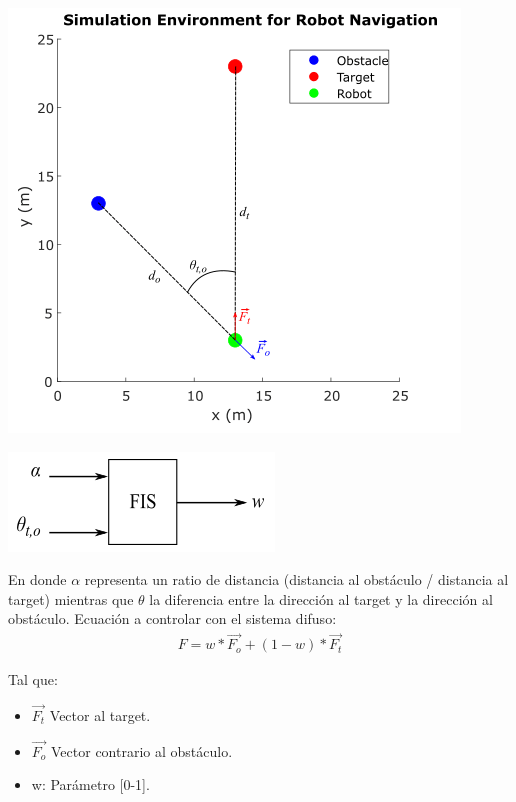 \begin{center}
    \includegraphics[scale=0.6]{Tesis/Capitulos/04_CAPITULO_2/img/MySimAvoidObs1_env.png}
\end{center}

\begin{center}
    \includegraphics[scale=0.6]{Tesis/Capitulos/04_CAPITULO_2/img/MySimAvoidObs1_system.png}
\end{center}

En donde $\alpha$ representa un ratio de distancia (distancia al obstáculo / distancia al target) mientras que $\theta$ la diferencia entre la dirección al target y la dirección al obstáculo.
\bigbreak
Ecuación a controlar con el sistema difuso:
\begin{equation}\boxed{
\begin{array}{rcl}
F = w*\vec{F_o} + (1-w)*\vec{F_t}
\end{array}}
\end{equation}

Tal que:
\begin{itemize}
    \item $\vec{F_t}$ Vector al target.
    \item $\vec{F_o}$ Vector contrario al obstáculo.
    \item w: Parámetro [0-1].
\end{itemize}

